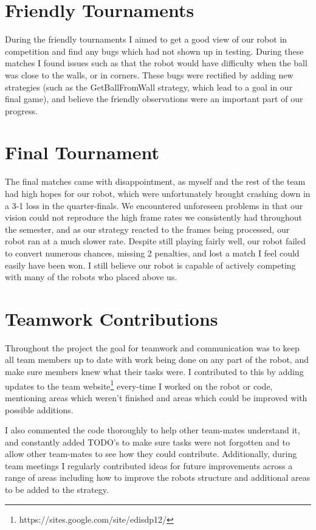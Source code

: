 \documentclass[12pt]{IEEEtran}
\begin{document}
\section{Friendly Tournaments}
During the friendly tournaments I aimed to get a good view of our robot in competition and find any bugs which had not shown up in testing. During these matches I found issues such as that the robot would have difficulty when the ball was close to the walls, or in corners. These bugs were rectified by adding new strategies (such as the GetBallFromWall strategy, which lead to a goal in our final game), and believe the friendly observations were an important part of our progress.


\section{Final Tournament}
The final matches came with disappointment, as myself and the rest of the team had high hopes for our robot, which were unfortunately brought crashing down in a 3-1 loss in the quarter-finals. We encountered unforeseen problems in that our vision could not reproduce the high frame rates we consistently had throughout the semester, and as our strategy reacted to the frames being processed, our robot ran at a much slower rate. Despite still playing fairly well, our robot failed to convert numerous chances, missing 2 penalties, and lost a match I feel could easily have been won. I still believe our robot is capable of actively competing with many of the robots who placed above us.

\section{Teamwork Contributions}
Throughout the project the goal for teamwork and communication was to keep all team members up to date with work being done on any part of the robot, and make sure members knew what their tasks were. I contributed to this by adding updates to the team website\footnote{https://sites.google.com/site/edisdp12/} every-time I worked on the robot or code, mentioning areas which weren't finished and areas which could be improved with possible additions. \linebreak

I also commented the code thoroughly to help other team-mates understand it, and constantly added TODO's to make sure tasks were not forgotten and to allow other team-mates to see how they could contribute. Additionally, during team meetings I regularly contributed ideas for future improvements across a range of areas including how to improve the robots structure and additional areas to be added to the strategy. \linebreak
\end{document}

